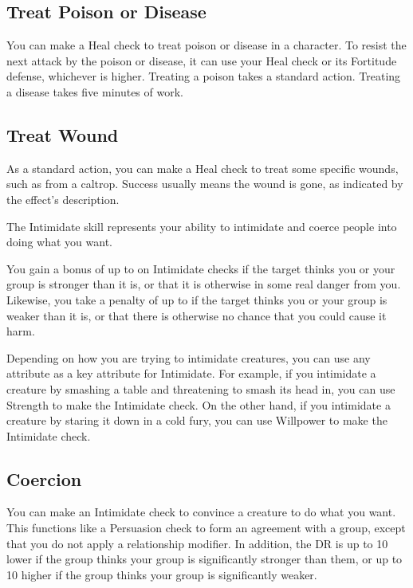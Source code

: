     \subsection{Treat Poison or Disease}
        You can make a Heal check to treat poison or disease in a character.
        To resist the next attack by the poison or disease, it can use your Heal check or its Fortitude defense, whichever is higher.
        Treating a poison takes a standard action. Treating a disease takes five minutes of work.

    \subsection{Treat Wound}
        As a standard action, you can make a Heal check to treat some specific wounds, such as from a caltrop. Success usually means the wound is gone, as indicated by the effect's description.

        The Intimidate skill represents your ability to intimidate and coerce people into doing what you want.

        You gain a bonus of up to  on Intimidate checks if the target thinks you or your group is stronger than it is, or that it is otherwise in some real danger from you. Likewise, you take a penalty of up to  if the target thinks you or your group is weaker than it is, or that there is otherwise no chance that you could cause it harm.

        Depending on how you are trying to intimidate creatures, you can use any attribute as a key attribute for Intimidate.
        For example, if you intimidate a creature by smashing a table and threatening to smash its head in, you can use Strength to make the Intimidate check.
        On the other hand, if you intimidate a creature by staring it down in a cold fury, you can use Willpower to make the Intimidate check.

    \subsection{Coercion}
        You can make an Intimidate check to convince a creature to do what you want. This functions like a Persuasion check to form an agreement with a group, except that you do not apply a relationship modifier. In addition, the DR is up to 10 lower if the group thinks your group is significantly stronger than them, or up to 10 higher if the group thinks your group is significantly weaker.

